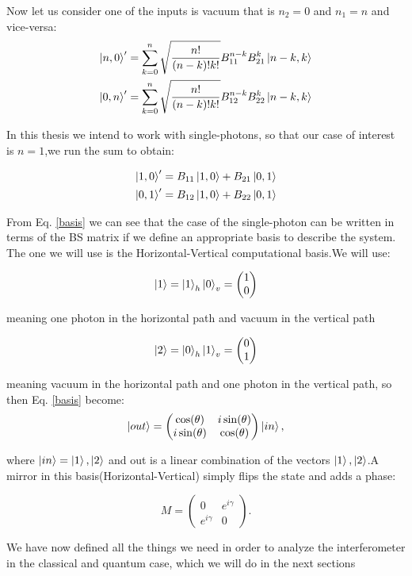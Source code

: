 \documentclass[11pt]{article}
\begin{document}
Now let us consider one of the inputs is vacuum that is $n_{2}=0$ and $n_{1}=n$  and vice-versa:
\begin{align}
    \ket{n,0}'=\sum^{n}_{k=0} \sqrt{\frac{n!}{(n-k)!k!}} B_{11}^{n-k} B_{21}^{k} \ket{n-k,k}\\
        \ket{0,n}'=\sum^{n}_{k=0} \sqrt{\frac{n!}{(n-k)!k!}} B_{12}^{n-k} B_{22}^{k} \ket{n-k,k}
\end{align}

In this thesis we intend to work with single-photons, so that our case of interest is $n=1$,we run the sum to obtain:

\begin{align}
\ket{1,0}'=B_{11}\ket{1,0}+B_{21}\ket{0,1} \\
\ket{0,1}'=B_{12}\ket{1,0}+B_{22}\ket{0,1}
\label{basis}
\end{align}


From Eq. \ref{basis} we can see that the case of the single-photon can be written in terms of the BS matrix if we define an appropriate basis to describe the system. The one we will use is the Horizontal-Vertical computational basis.We will use:

 \begin{equation}
 \ket{1}=\ket{1}_{h}\ket{0}_{v}=\begin{pmatrix} 1 \\0\end{pmatrix}
 \end{equation} 

 meaning one photon in the horizontal path and vacuum in the vertical path
 
 \begin{equation}
 \ket{2}=\ket{0}_{h}\ket{1}_{v}=\begin{pmatrix} 0 \\1 \end{pmatrix}
 \end{equation}
 
meaning vacuum  in the horizontal path and one photon in the vertical path, so then Eq. \ref{basis} become:
\begin{equation}
\ket{out}=\begin{pmatrix} \cos(\theta) & i \sin(\theta) \\ i \sin(\theta) & \cos(\theta) \end{pmatrix} \ket{in},
\end{equation}

where $\ket{in}=\ket{1},\ket{2}$ and out is a linear combination of the vectors $\ket{1},\ket{2}$.A mirror in this basis(Horizontal-Vertical) simply flips the state and adds a phase: 
 
\begin{equation}
M=\begin{pmatrix} 0& e^{i\gamma}  \\ e^{i\gamma} & 0 \end{pmatrix}.
\end{equation}

We have now defined all the things we need in order to analyze the interferometer in the classical and quantum case, which we will do in the next sections
\end{document}
